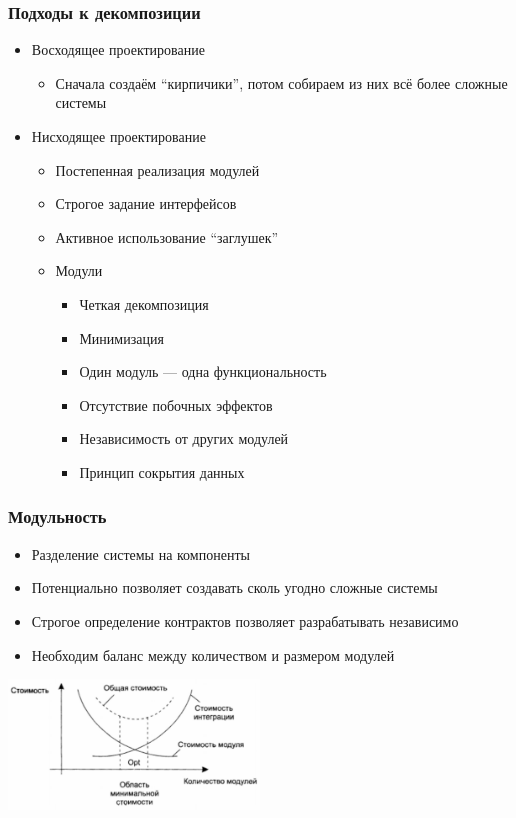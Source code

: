\documentclass[xetex,mathserif,serif]{beamer}
\begin{document}
	\begin{frame}
		\frametitle{Подходы к декомпозиции}
		\begin{itemize}
			\item Восходящее проектирование
			\begin{itemize}
				\item Сначала создаём ``кирпичики'', потом собираем из них всё более сложные системы
			\end{itemize}
			\item Нисходящее проектирование
			\begin{itemize}
				\item Постепенная реализация модулей
				\item Строгое задание интерфейсов
				\item Активное использование ``заглушек''
				\item Модули
				\begin{itemize}
					\item Четкая декомпозиция
					\item Минимизация
					\item Один модуль --- одна функциональность
					\item Отсутствие побочных эффектов
					\item Независимость от других модулей
					\item Принцип сокрытия данных
				\end{itemize}
			\end{itemize}
		\end{itemize}
	\end{frame}
	
	\begin{frame}
		\frametitle{Модульность}
		\begin{itemize}
			\item Разделение системы на компоненты
			\item Потенциально позволяет создавать сколь угодно сложные системы
			\item Строгое определение контрактов позволяет разрабатывать независимо
			\item Необходим баланс между количеством и размером модулей
		\end{itemize}
		\vskip 1cm
		\begin{center}
			\includegraphics[width=0.5\textwidth]{modulesCost.png}
		\end{center}
	\end{frame}
\end{document}
